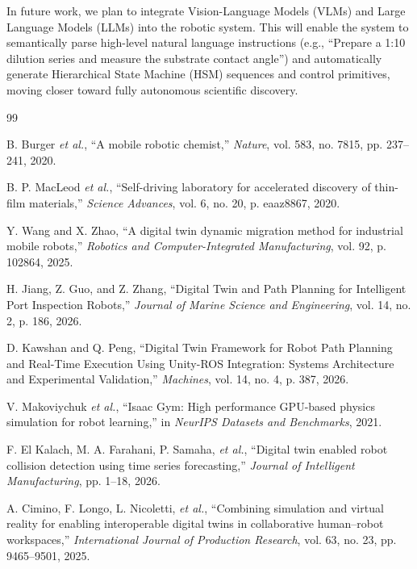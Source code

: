 \documentclass[journal,twocolumn]{IEEEtran}
\begin{document}
In future work, we plan to integrate Vision-Language Models (VLMs) and Large Language Models (LLMs) into the robotic system. This will enable the system to semantically parse high-level natural language instructions (e.g., ``Prepare a 1:10 dilution series and measure the substrate contact angle'') and automatically generate Hierarchical State Machine (HSM) sequences and control primitives, moving closer toward fully autonomous scientific discovery.

\begin{thebibliography}{99}

B. Burger \textit{et al.}, ``A mobile robotic chemist,'' \textit{Nature}, vol. 583, no. 7815, pp. 237--241, 2020.

B. P. MacLeod \textit{et al.}, ``Self-driving laboratory for accelerated discovery of thin-film materials,'' \textit{Science Advances}, vol. 6, no. 20, p. eaaz8867, 2020.

Y. Wang and X. Zhao, ``A digital twin dynamic migration method for industrial mobile robots,'' \textit{Robotics and Computer-Integrated Manufacturing}, vol. 92, p. 102864, 2025.

H. Jiang, Z. Guo, and Z. Zhang, ``Digital Twin and Path Planning for Intelligent Port Inspection Robots,'' \textit{Journal of Marine Science and Engineering}, vol. 14, no. 2, p. 186, 2026.

D. Kawshan and Q. Peng, ``Digital Twin Framework for Robot Path Planning and Real-Time Execution Using Unity-ROS Integration: Systems Architecture and Experimental Validation,'' \textit{Machines}, vol. 14, no. 4, p. 387, 2026.

V. Makoviychuk \textit{et al.}, ``Isaac Gym: High performance GPU-based physics simulation for robot learning,'' in \textit{NeurIPS Datasets and Benchmarks}, 2021.

F. El Kalach, M. A. Farahani, P. Samaha, \textit{et al.}, ``Digital twin enabled robot collision detection using time series forecasting,'' \textit{Journal of Intelligent Manufacturing}, pp. 1--18, 2026.

A. Cimino, F. Longo, L. Nicoletti, \textit{et al.}, ``Combining simulation and virtual reality for enabling interoperable digital twins in collaborative human--robot workspaces,'' \textit{International Journal of Production Research}, vol. 63, no. 23, pp. 9465--9501, 2025.


\end{thebibliography}
\end{document}
